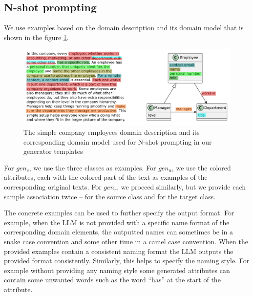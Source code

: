 \subsection{N-shot prompting}

We use examples based on the domain description and its domain model that is shown in the figure \ref{fig:prompting-domain}.

\begin{figure}[!h]
    \centering
    \includegraphics[scale=0.6]{img/prompting-domain.pdf}
    \caption{\centering The simple company employees domain description and its corresponding domain model used for N-shot prompting in our generator templates}
    \label{fig:prompting-domain}
\end{figure}


For $gen_c$, we use the three classes as examples. For $gen_a$, we use the colored attributes, each with the colored part of the text as examples of the corresponding original texts. For $gen_r$, we proceed similarly, but we provide each sample association twice – for the source class and for the target class.

The concrete examples can be used to further specify the output format. For example,  when the LLM is not provided with a specific name format of the corresponding domain elements, the outputted names can sometimes be in a snake case convention and some other time in a camel case convention. When the provided examples contain a consistent naming format the LLM outputs the provided format consistently. Similarly, this helps to specify the naming style. For example without providing any naming style some generated attributes can contain some unwanted words such as the word ``has'' at the start of the attribute.
